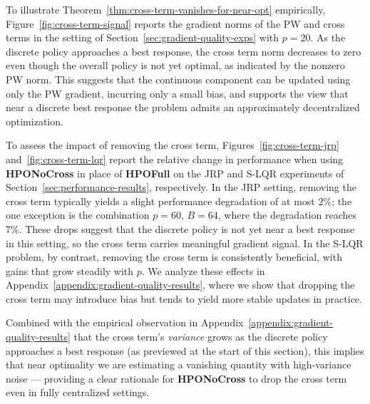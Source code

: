 \documentclass{article}
\theoremstyle{definition}
\theoremstyle{remark}
\begin{document}
To illustrate Theorem~\ref{thm:cross-term-vanishes-for-near-opt} empirically, Figure~\ref{fig:cross-term-signal} reports the gradient norms of the PW and cross terms in the setting of Section~\ref{sec:gradient-quality-exps} with $p=20$. As the discrete policy approaches a best response, the cross term norm decreases to zero even though the overall policy is not yet optimal, as indicated by the nonzero PW norm. This suggests that the continuous component can be updated using only the PW gradient, incurring only a small bias, and supports the view that near a discrete best response the problem admits an approximately decentralized optimization.

To assess the impact of removing the cross term, Figures~\ref{fig:cross-term-jrp}
and~\ref{fig:cross-term-lqr} report the relative change in performance when using
\textbf{HPONoCross} in place of \textbf{HPOFull} on the JRP and S-LQR experiments of
Section~\ref{sec:performance-results}, respectively. In the JRP setting, removing the
cross term typically yields a slight performance degradation of at most $2\%$; the one
exception is the combination $p=60$, $B=64$, where the degradation reaches $7\%$.
These drops suggest that the discrete policy is not yet near a best response in this
setting, so the cross term carries meaningful gradient signal. In the S-LQR problem, by contrast, removing the cross
term is consistently beneficial, with gains that grow steadily with $p$. We analyze
these effects in Appendix~\ref{appendix:gradient-quality-results}, where we show that
dropping the cross term may introduce bias but tends to yield more stable updates in
practice.

Combined with the empirical observation in Appendix~\ref{appendix:gradient-quality-results} that the cross term's \emph{variance} grows as the discrete policy approaches a best response (as previewed at the start of this section), this implies that near optimality we are estimating a vanishing quantity with high-variance noise --- providing a clear rationale for \textbf{HPONoCross} to drop the cross term even in fully centralized settings.
\end{document}
